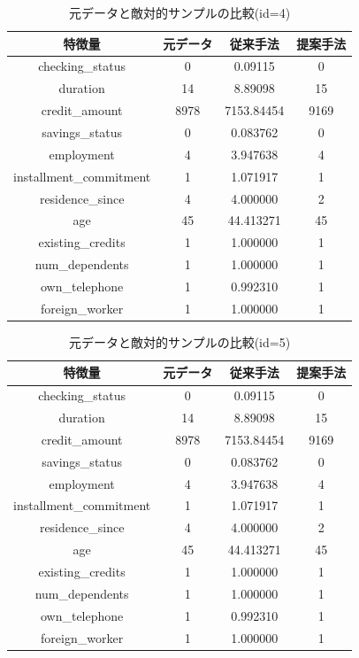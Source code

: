 \begin{table}[H]
    \centering
    \caption{元データと敵対的サンプルの比較(id=4)}
    \begin{tabular}{|c|c|c|c|} \hline
        特徴量 & 元データ & 従来手法 & 提案手法 \\ \hline
        checking\_status & 0 & 0.09115 & 0\\ \hline
        duration & 14 & 8.89098 & 15 \\ \hline
        credit\_amount & 8978 & 7153.84454 & 9169 \\ \hline
        savings\_status & 0 & 0.083762 & 0\\ \hline
        employment & 4 & 3.947638  & 4 \\ \hline
        installment\_commitment & 1 & 1.071917 & 1\\ \hline
        residence\_since & 4 & 4.000000 & 2 \\ \hline
        age & 45 & 44.413271 & 45 \\ \hline
        existing\_credits & 1 & 1.000000 & 1 \\ \hline
        num\_dependents & 1 & 1.000000 & 1 \\ \hline
        own\_telephone & 1 & 0.992310 & 1 \\ \hline
        foreign\_worker & 1 & 1.000000 & 1 \\ \hline
    \end{tabular}
\end{table}

\begin{table}[H]
    \centering
    \caption{元データと敵対的サンプルの比較(id=5)}
    \begin{tabular}{|c|c|c|c|} \hline
        特徴量 & 元データ & 従来手法 & 提案手法 \\ \hline
        checking\_status & 0 & 0.09115 & 0\\ \hline
        duration & 14 & 8.89098 & 15 \\ \hline
        credit\_amount & 8978 & 7153.84454 & 9169 \\ \hline
        savings\_status & 0 & 0.083762 & 0\\ \hline
        employment & 4 & 3.947638  & 4 \\ \hline
        installment\_commitment & 1 & 1.071917 & 1\\ \hline
        residence\_since & 4 & 4.000000 & 2 \\ \hline
        age & 45 & 44.413271 & 45 \\ \hline
        existing\_credits & 1 & 1.000000 & 1 \\ \hline
        num\_dependents & 1 & 1.000000 & 1 \\ \hline
        own\_telephone & 1 & 0.992310 & 1 \\ \hline
        foreign\_worker & 1 & 1.000000 & 1 \\ \hline
    \end{tabular}
\end{table}

